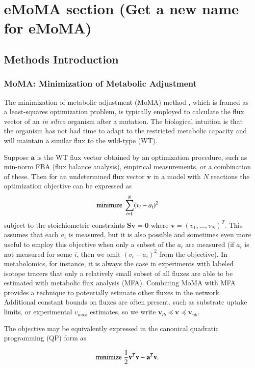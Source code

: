 \documentclass[phd,tocprelim]{cornell}
\begin{document}
\chapter{eMoMA section (Get a new name for eMoMA)}

\section{Methods Introduction}
\subsection{MoMA: Minimization of Metabolic Adjustment}

The minimization of metabolic adjustment (MoMA) method \cite{Segre2002}, 
which is framed as a least-squares optimization problem, is typically employed
to calculate the flux vector of an \emph{in silico} organism after a
mutation.  The biological intuition is that the organism has not had
time to adapt to the restricted metabolic capacity and will maintain
a similar flux to the wild-type (WT).

Suppose $\mathbf{a}$ is the WT flux vector obtained by an optimization procedure, 
such as min-norm FBA (flux balance analysis), empirical measurements, or a
combination of these. Then for an undetermined flux vector $\mathbf{v}$ in a model 
with $N$ reactions the optimization objective can be expressed as
\[ \textnormal{minimize}\ \sum^N_{i=1}(v_i-a_i)^2 \]
subject to the stoichiometric constraints $\mathbf{S v} = \mathbf{0}$
where $\mathbf{v} = (v_1, \ldots, v_N)^T$. This assumes that each $a_i$ is measured,
but it is also possible and sometimes even more useful to employ this objective when only
a subset of the $a_i$ are measured (if $a_i$ is not measured for some $i$, then we omit
$(v_i-a_i)^2$ from the objective). In metabolomics, for instance, it is always the case in experiments with 
labeled isotope tracers that only a relatively small subset of all fluxes are able to be estimated 
with metabolic flux analysis (MFA). Combining MoMA with MFA provides a technique to 
potentially estimate other fluxes in the network. 
Additional constant bounds on fluxes are often present, such as substrate uptake limits,
or experimental $v_{max}$ estimates, so we write 
$\mathbf{v}_{lb} \preceq \mathbf{v} \preceq \mathbf{v}_{ub}$.  

The objective may be equivalently expressed in the 
canonical quadratic programming (QP) form as

\[ \textnormal{minimize}\ \frac{1}{2}\mathbf{v}^T \mathbf{v} - \mathbf{a}^T \mathbf{v}\textnormal{.}\]
\end{document}
